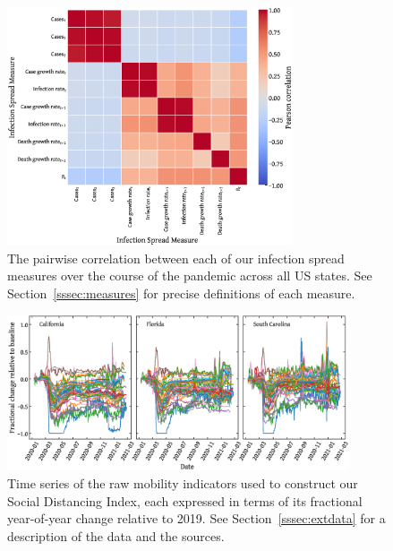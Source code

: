 \documentclass[dvipsnames]{article}
\begin{document}
\begin{figure}[h!]
    \centering
    \includegraphics[width=0.75\textwidth]{corr_outcomes.eps}
    \caption{The pairwise correlation between each of our infection spread measures over the course of the pandemic across all US states. See Section~\ref{sssec:measures} for precise definitions of each measure.}
    \label{fig:corr_outcomes}
\end{figure}

\begin{figure}[h!]
    \centering
    \includegraphics[width=0.9\textwidth]{raw_indicators.eps}
    \caption{Time series of the raw mobility indicators used to construct our Social Distancing Index, each expressed in terms of its fractional year-of-year change relative to 2019. See Section~\ref{sssec:extdata} for a description of the data and the sources.}
    \label{fig:raw_indicators}
\end{figure}
\end{document}
